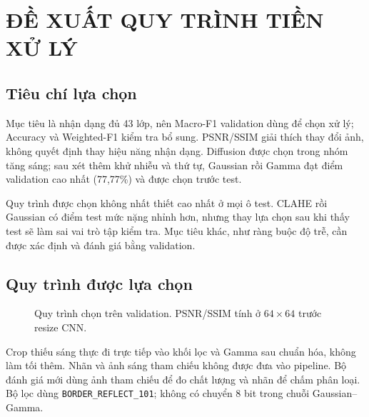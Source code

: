 \section{ĐỀ XUẤT QUY TRÌNH TIỀN XỬ LÝ}
\subsection{Tiêu chí lựa chọn}
Mục tiêu là nhận dạng đủ 43 lớp, nên Macro-F1 validation dùng để chọn xử lý; Accuracy và Weighted-F1 kiểm tra bổ sung. PSNR/SSIM giải thích thay đổi ảnh, không quyết định thay hiệu năng nhận dạng. Diffusion được chọn trong nhóm tăng sáng; sau xét thêm khử nhiễu và thứ tự, Gaussian rồi Gamma đạt điểm validation cao nhất (77,77\%) và được chọn trước test.

Quy trình được chọn không nhất thiết cao nhất ở mọi ô test. CLAHE rồi Gaussian có điểm test mức nặng nhỉnh hơn, nhưng thay lựa chọn sau khi thấy test sẽ làm sai vai trò tập kiểm tra. Mục tiêu khác, như ràng buộc độ trễ, cần được xác định và đánh giá bằng validation.

\subsection{Quy trình được lựa chọn}
\begin{figure}[!htbp]\centering\setlength{\fboxsep}{7pt}
\caption{Quy trình chọn trên validation. PSNR/SSIM tính ở $64\times64$ trước resize CNN.}\label{fig:pipeline}\end{figure}

Crop thiếu sáng thực đi trực tiếp vào khối lọc và Gamma sau chuẩn hóa, không làm tối thêm. Nhãn và ảnh sáng tham chiếu không được đưa vào pipeline. Bộ đánh giá mới dùng ảnh tham chiếu để đo chất lượng và nhãn để chấm phân loại. Bộ lọc dùng \texttt{BORDER\_REFLECT\_101}; không có chuyển 8 bit trong chuỗi Gaussian--Gamma.

